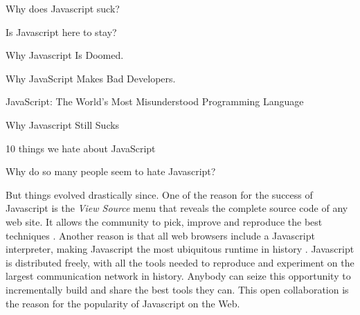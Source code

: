 {
\fontsize{10pt}{10pt}\selectfont
Why does Javascript suck?

Is Javascript here to stay?

Why Javascript Is Doomed.

Why JavaScript Makes Bad Developers.

JavaScript: The World's Most Misunderstood Programming Language

Why Javascript Still Sucks

10 things we hate about JavaScript

Why do so many people seem to hate Javascript?
}

But things evolved drastically since.
One of the reason for the success of Javascript is the \textit{View Source} menu that reveals the complete source code of any web site.
It allows the community to pick, improve and reproduce the best techniques .
Another reason is that all web browsers include a Javascript interpreter, making Javascript the most ubiquitous runtime in history \cite{Flanagan2006}.
Javascript is distributed freely, with all the tools needed to reproduce and experiment on the largest communication network in history.
Anybody can seize this opportunity to incrementally build and share the best tools they can.
This open collaboration is the reason for the popularity of Javascript on the Web.


